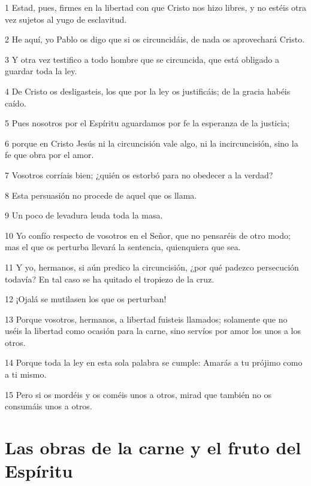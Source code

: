 \par 1 Estad, pues, firmes en la libertad con que Cristo nos hizo libres, y no estéis otra vez sujetos al yugo de esclavitud.
\par 2 He aquí, yo Pablo os digo que si os circuncidáis, de nada os aprovechará Cristo.
\par 3 Y otra vez testifico a todo hombre que se circuncida, que está obligado a guardar toda la ley.
\par 4 De Cristo os desligasteis, los que por la ley os justificáis; de la gracia habéis caído.
\par 5 Pues nosotros por el Espíritu aguardamos por fe la esperanza de la justicia;
\par 6 porque en Cristo Jesús ni la circuncisión vale algo, ni la incircuncisión, sino la fe que obra por el amor.
\par 7 Vosotros corríais bien; ¿quién os estorbó para no obedecer a la verdad?
\par 8 Esta persuasión no procede de aquel que os llama.
\par 9 Un poco de levadura leuda toda la masa.
\par 10 Yo confío respecto de vosotros en el Señor, que no pensaréis de otro modo; mas el que os perturba llevará la sentencia, quienquiera que sea.
\par 11 Y yo, hermanos, si aún predico la circuncisión, ¿por qué padezco persecución todavía? En tal caso se ha quitado el tropiezo de la cruz.
\par 12 ¡Ojalá se mutilasen los que os perturban!
\par 13 Porque vosotros, hermanos, a libertad fuisteis llamados; solamente que no uséis la libertad como ocasión para la carne, sino servíos por amor los unos a los otros.
\par 14 Porque toda la ley en esta sola palabra se cumple: Amarás a tu prójimo como a ti mismo.
\par 15 Pero si os mordéis y os coméis unos a otros, mirad que también no os consumáis unos a otros.

\section*{Las obras de la carne y el fruto del Espíritu}

